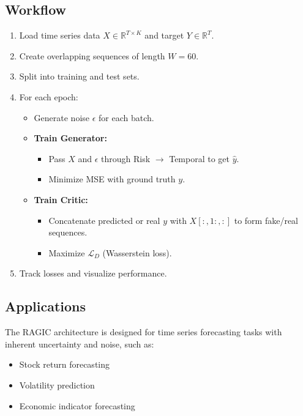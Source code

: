 \subsection{Workflow}

\begin{enumerate}
    \item Load time series data $X \in \mathbb{R}^{T \times K}$ and target $Y \in \mathbb{R}^T$.
    \item Create overlapping sequences of length $W=60$.
    \item Split into training and test sets.
    \item For each epoch:
    \begin{itemize}
        \item Generate noise $\epsilon$ for each batch.
        \item \textbf{Train Generator:}
            \begin{itemize}
                \item Pass $X$ and $\epsilon$ through Risk $\rightarrow$ Temporal to get $\hat{y}$.
                \item Minimize MSE with ground truth $y$.
            \end{itemize}
        \item \textbf{Train Critic:}
            \begin{itemize}
                \item Concatenate predicted or real $y$ with $X[:, 1:, :]$ to form fake/real sequences.
                \item Maximize $\mathcal{L}_D$ (Wasserstein loss).
            \end{itemize}
    \end{itemize}
    \item Track losses and visualize performance.
\end{enumerate}

\subsection{Applications}

The RAGIC architecture is designed for time series forecasting tasks with inherent uncertainty and noise, such as:
\begin{itemize}
    \item Stock return forecasting
    \item Volatility prediction
    \item Economic indicator forecasting
\end{itemize}

